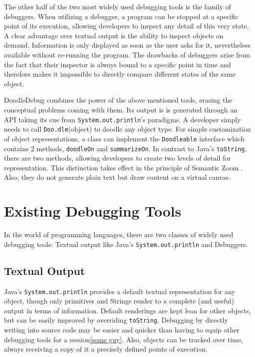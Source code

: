 \documentclass[english]{scrartcl}
\newcommand{\DD}{Dood\-le\-De\-bug\xspace}
\newcommand{\Doodle}{\texttt{Doo.\-dle}\xspace}
\newcommand{\println}{\texttt{Sys\-tem.\-out.\-println}\xspace}
\begin{document}
The other half of the two most widely used debugging tools is the family of debuggers.
When utilizing a debugger, a program can be stopped at a specific point of its execution, allowing developers to inspect any detail of this very state.
A clear advantage over textual output is the ability to inspect objects on demand.
Information is only displayed as soon as the user asks for it, nevertheless available without re-running the program.
The drawbacks of debuggers arise from the fact that their inspector is always bound to a specific point in time and therefore makes it impossible to directly compare different states of the same object.

\DD combines the power of the above mentioned tools, erasing the conceptual problems coming with them.
Its output is is generated through an API taking its cue from \println's paradigms.
A developer simply needs to call \Doodle(object) to doodle any object type.
For simple customization of object representations, a class can implement the \texttt{Doodleable} interface which contains 2 methods, \texttt{doodleOn} and \texttt{summarizeOn}.
In contrast to Java's \texttt{toString}, there are two methods, allowing developers to create two levels of detail for representation.
This distinction takes effect in the principle of Semantic Zoom \cite{semantic-zoom}.
Also, they do not generate plain text but draw content on a virtual canvas.

\section{Existing Debugging Tools}
In the world of programming languages, there are two classes of widely used debugging tools:
Textual output like Java's \println and Debuggers.

\subsection{Textual Output}
Java's \println provides a default textual representation for any object, though only primitives and Strings render to a complete (and useful) output in terms of information.
Default renderings are kept lean for other objects, but can be easily improved by overriding \texttt{toString}.
Debugging by directly writing into source code may be easier and quicker than having to equip other debugging tools for a session\ref{some guy}.
Also, objects can be tracked over time, always receiving a copy of it a precisely defined points of execution.
\end{document}
